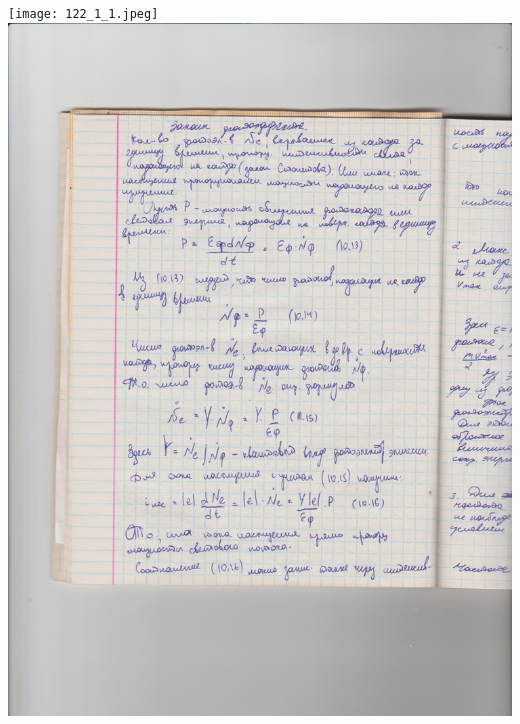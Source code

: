 \documentclass[12pt]{article}
\begin{document}
\texttt{[image: 122\_1\_1.jpeg]}\\
\includegraphics {122_2.jpeg}\\
\end{document}
